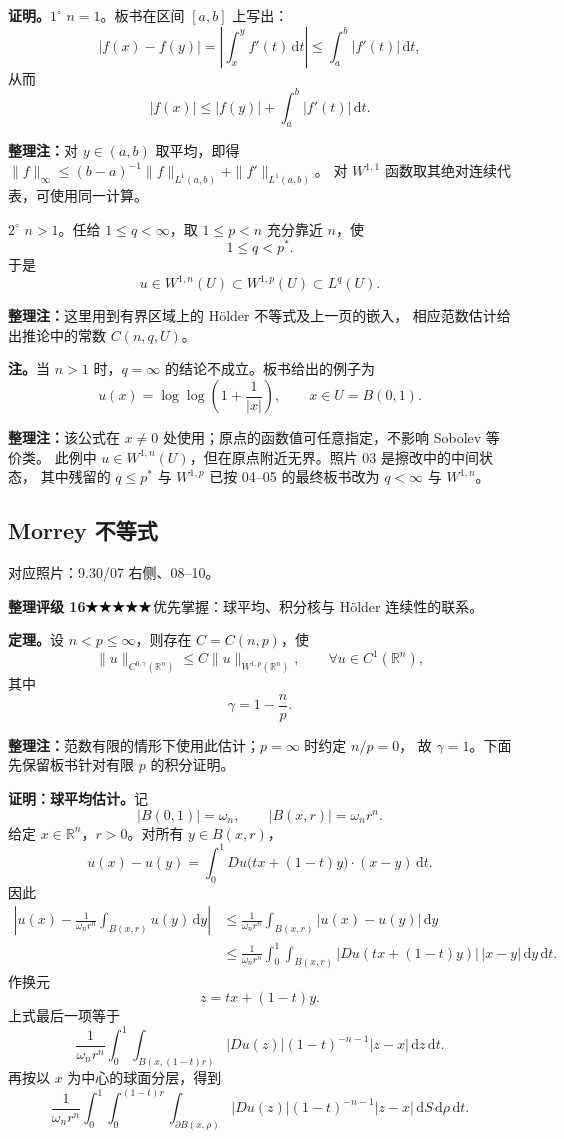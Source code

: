 \documentclass[UTF8,a4paper,11pt,fontset=fandol]{ctexart}
\newcommand{\R}{\mathbb R}
\newcommand{\dd}{\,\mathrm d}
\newcommand{\ednote}[1]{\par{\small\color{notegray}\textbf{整理注：}#1}\par}
\newcommand{\source}[1]{{\small\color{notegray}对应照片：#1。}\par}
\newcommand{\proofstars}[1]{\ensuremath{%
\ifnum#1>0\relax\bigstar\fi
\ifnum#1>1\relax\bigstar\fi
\ifnum#1>2\relax\bigstar\fi
\ifnum#1>3\relax\bigstar\fi
\ifnum#1>4\relax\bigstar\fi}}
\newcommand{\proofrating}[3]{\par{\small\color{proofblue}%
\textbf{整理评级 #1}\enspace\proofstars{#2}\quad #3\par}}
\begin{document}
\textbf{证明。}$1^\circ$ $n=1$。板书在区间 $[a,b]$ 上写出：
\[
|f(x)-f(y)|
=\left|\int_x^y f'(t)\dd t\right|
\leq\int_a^b|f'(t)|\dd t,
\]
从而
\[
|f(x)|\leq |f(y)|+\int_a^b|f'(t)|\dd t.
\]
\ednote{对 $y\in(a,b)$ 取平均，即得
$\|f\|_\infty\leq (b-a)^{-1}\|f\|_{L^1(a,b)}+\|f'\|_{L^1(a,b)}$。
对 $W^{1,1}$ 函数取其绝对连续代表，可使用同一计算。}

$2^\circ$ $n>1$。任给 $1\leq q<\infty$，取 $1\leq p<n$ 充分靠近 $n$，使
\[
1\leq q<p^*.
\]
于是
\[
u\in W^{1,n}(U)\subset W^{1,p}(U)\subset L^q(U).
\]
\ednote{这里用到有界区域上的 Hölder 不等式及上一页的嵌入，
相应范数估计给出推论中的常数 $C(n,q,U)$。}

\textbf{注。}当 $n>1$ 时，$q=\infty$ 的结论不成立。板书给出的例子为
\[
u(x)=\log\log\left(1+\frac1{|x|}\right),
\qquad x\in U=B(0,1).
\]
\ednote{该公式在 $x\ne0$ 处使用；原点的函数值可任意指定，不影响 Sobolev 等价类。
此例中 $u\in W^{1,n}(U)$，但在原点附近无界。照片 03 是擦改中的中间状态，
其中残留的 $q\leq p^*$ 与 $W^{1,p}$ 已按 04--05 的最终板书改为
$q<\infty$ 与 $W^{1,n}$。}

\newpage
\subsection{Morrey 不等式}
\source{9.30/07 右侧、08--10}
\proofrating{16}{5}{优先掌握：球平均、积分核与 Hölder 连续性的联系。}
\textbf{定理。}设 $n<p\leq\infty$，则存在 $C=C(n,p)$，使
\[
\boxed{\|u\|_{C^{0,\gamma}(\R^n)}
\leq C\|u\|_{W^{1,p}(\R^n)},\qquad
\forall u\in C^1(\R^n),}
\]
其中
\[
\gamma=1-\frac np.
\]
\ednote{范数有限的情形下使用此估计；$p=\infty$ 时约定 $n/p=0$，
故 $\gamma=1$。下面先保留板书针对有限 $p$ 的积分证明。}

\textbf{证明：球平均估计。}记
\[
|B(0,1)|=\omega_n,\qquad |B(x,r)|=\omega_n r^n.
\]
给定 $x\in\R^n$，$r>0$。对所有 $y\in B(x,r)$，
\[
u(x)-u(y)
=\int_0^1 Du\bigl(tx+(1-t)y\bigr)\cdot(x-y)\dd t.
\]
因此
\[
\begin{aligned}
\left|u(x)-\frac1{\omega_n r^n}\int_{B(x,r)}u(y)\dd y\right|
&\leq\frac1{\omega_n r^n}\int_{B(x,r)}|u(x)-u(y)|\dd y\\
&\leq\frac1{\omega_n r^n}\int_0^1\int_{B(x,r)}
\bigl|Du(tx+(1-t)y)\bigr|\,|x-y|\dd y\dd t.
\end{aligned}
\]
作换元
\[
z=tx+(1-t)y.
\]
上式最后一项等于
\[
\frac1{\omega_n r^n}
\int_0^1\int_{B(x,(1-t)r)}
|Du(z)|(1-t)^{-n-1}|z-x|\dd z\dd t.
\]
再按以 $x$ 为中心的球面分层，得到
\[
\frac1{\omega_n r^n}
\int_0^1\int_0^{(1-t)r}\int_{\partial B(x,\rho)}
|Du(z)|(1-t)^{-n-1}|z-x|\dd S\dd\rho\dd t.
\]
\end{document}
